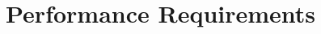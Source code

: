 \documentclass[../../rasd.tex]{subfiles}
\begin{document}
\section{Performance Requirements}

\newpage
\end{document}
